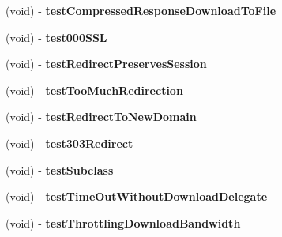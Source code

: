 \begin{DoxyCompactItemize}
\item 
\hypertarget{interface_a_s_i_h_t_t_p_request_tests_ad9fe5125c3c071c35369d0df17222250}{
(void) -\/ {\bfseries test\-Compressed\-Response\-Download\-To\-File}}
\label{interface_a_s_i_h_t_t_p_request_tests_ad9fe5125c3c071c35369d0df17222250}

\item 
\hypertarget{interface_a_s_i_h_t_t_p_request_tests_a91af84b41f3a46f64d16095adb340214}{
(void) -\/ {\bfseries test000\-S\-S\-L}}
\label{interface_a_s_i_h_t_t_p_request_tests_a91af84b41f3a46f64d16095adb340214}

\item 
\hypertarget{interface_a_s_i_h_t_t_p_request_tests_a3132c64a767dc4789eedb611544874b7}{
(void) -\/ {\bfseries test\-Redirect\-Preserves\-Session}}
\label{interface_a_s_i_h_t_t_p_request_tests_a3132c64a767dc4789eedb611544874b7}

\item 
\hypertarget{interface_a_s_i_h_t_t_p_request_tests_abdde777c6d2c53c38bbbd414f01ab11c}{
(void) -\/ {\bfseries test\-Too\-Much\-Redirection}}
\label{interface_a_s_i_h_t_t_p_request_tests_abdde777c6d2c53c38bbbd414f01ab11c}

\item 
\hypertarget{interface_a_s_i_h_t_t_p_request_tests_a0e46e6d0e9b2075145255c89cb0f23ae}{
(void) -\/ {\bfseries test\-Redirect\-To\-New\-Domain}}
\label{interface_a_s_i_h_t_t_p_request_tests_a0e46e6d0e9b2075145255c89cb0f23ae}

\item 
\hypertarget{interface_a_s_i_h_t_t_p_request_tests_a486f80b7859c2c3ea72e06a28fdcf789}{
(void) -\/ {\bfseries test303\-Redirect}}
\label{interface_a_s_i_h_t_t_p_request_tests_a486f80b7859c2c3ea72e06a28fdcf789}

\item 
\hypertarget{interface_a_s_i_h_t_t_p_request_tests_aeb6e4b4f2fc9f3a74b3cd2a6c42341d5}{
(void) -\/ {\bfseries test\-Subclass}}
\label{interface_a_s_i_h_t_t_p_request_tests_aeb6e4b4f2fc9f3a74b3cd2a6c42341d5}

\item 
\hypertarget{interface_a_s_i_h_t_t_p_request_tests_ae19beb94bca46a1dcb81e4729dc89f2f}{
(void) -\/ {\bfseries test\-Time\-Out\-Without\-Download\-Delegate}}
\label{interface_a_s_i_h_t_t_p_request_tests_ae19beb94bca46a1dcb81e4729dc89f2f}

\item 
\hypertarget{interface_a_s_i_h_t_t_p_request_tests_af14e80be1ca16f71c636a799356bb92d}{
(void) -\/ {\bfseries test\-Throttling\-Download\-Bandwidth}}
\label{interface_a_s_i_h_t_t_p_request_tests_af14e80be1ca16f71c636a799356bb92d}


\end{DoxyCompactItemize}
